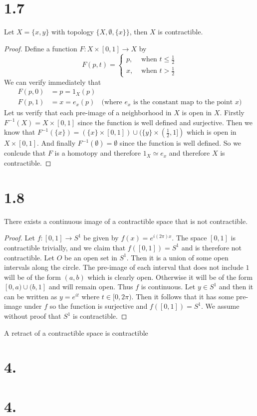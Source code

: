 \documentclass{article}
\theoremstyle{definition}
\begin{document}
\section*{1.7}
    \begin{mdframed}[]
        Let $X = \{x,y\}$ with topology $\{X, \emptyset, \{x\}\}$, then $X$ is contractible.
    \end{mdframed}
    \begin{proof}
        Define a function $F:X \times [0,1] \rightarrow X$ by 
        \[
            F(p,t) = 
            \begin{cases}
                p, & \text{ when } t \leq \frac{1}{2}\\
                x, & \text{ when } t > \frac{1}{2}
            \end{cases}
        \]
        We can verify immediately that 
        \begin{align*}
            F(p,0) &= p = 1_X(p)\\
            F(p,1) &= x = e_x(p) & \text{(where $e_x$ is the constant map to the point $x$)}
        \end{align*}
        Let us verify that each pre-image of a neighborhood in $X$ is open in $X$.
        Firstly $F^{-1}(X) = X \times [0,1]$ since the function is well defined and surjective.
        Then we know that $F^{-1}(\{x\}) = (\{x\} \times [0,1]) \cup (\{y\} \times (\frac{1}{2}, 1])$ which is open 
        in $X \times [0,1]$. And finally $F^{-1}(\emptyset) = \emptyset$ since the function is well defined.
        So we conlcude that $F$ is a homotopy and therefore $1_X \simeq e_x$ and therefore $X$ is contractible.
    \end{proof}
\section*{1.8}
    \begin{mdframed}[]
        There exists a continuous image of a contractible space that is not contractible.
    \end{mdframed}
    \begin{proof}
        Let $f:[0,1] \rightarrow S^1$ be given by $f(x) = e^{i(2\pi)x}$. The space $[0,1]$ is contractible
        trivially, and we claim that $f([0,1]) = S^1$ and is therefore not contractible. Let $O$ be an open
        set in $S^1$. Then it is a union of some open intervals along the circle. The pre-image of each interval
        that does not include $1$ will be of the form $(a,b)$ which is clearly open. Otherwise it will be of the 
        form $[0,a) \cup (b,1]$ and will remain open. Thus $f$ is continuous. Let $y \in S^1$ and then it can be written 
        as $y = e^{i t}$ where $t \in [0,2\pi)$. Then it follows that it has some pre-image under $f$ so the 
        function is surjective and $f([0,1]) = S^1$. We assume without proof that $S^1$ is contractible.
    \end{proof}
    \begin{mdframed}[]
        A retract of a contractible space is contractible
    \end{mdframed}
\section*{4.}
\section*{4.}
\end{document}
